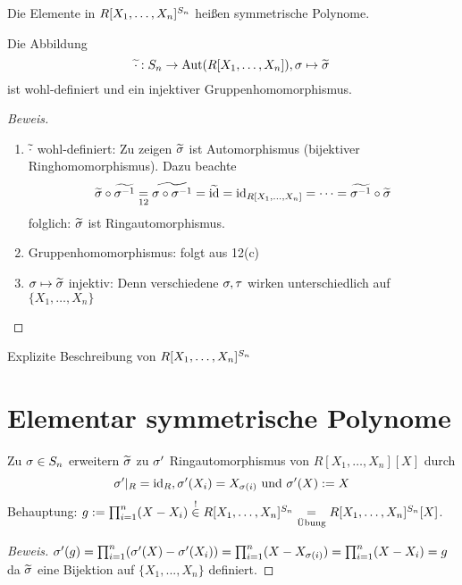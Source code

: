 \documentclass[a4paper]{report}
\begin{document}
\begin{defi}
Die Elemente in $R[X_{1}, \ldots, X_{n}]^{\Sn}$ heißen symmetrische Polynome.
\end{defi}

\begin{kor} Die Abbildung
  \[\tilde \cd : \Sn \to \Aut(R[X_{1}, \ldots, X_{n}]), \s \mps \tilde \s\]
  ist wohl-definiert und ein injektiver Gruppenhomomorphismus.

 \begin{proof}[Beweis]\item
\begin{enumerate}[1)]
  \item $\tilde \cd$ wohl-definiert: Zu zeigen $\tilde \s$ ist Automorphismus (bijektiver Ringhomomorphismus). Dazu beachte
        \[\tilde \s \circ \tilde {\s^{-1}} \underset{12} = \tilde{\s \circ \s^{-1}} = \tilde \id = \id_{R[X_{1}, \ldots, X_{n}]} = \cdots = \tilde {\s^{-1}} \circ \tilde \s\]
        folglich: $\tilde \s$ ist Ringautomorphismus.
  \item Gruppenhomomorphismus: folgt aus 12(c)
  \item $\s \mps \tilde \s$ injektiv: Denn verschiedene $\s, \tau$ wirken unterschiedlich auf $\{X_{1}, \ldots, X_{n}\}$
\end{enumerate}
 \end{proof}
\end{kor}

\begin{bem*}
Explizite Beschreibung von $R[X_{1}, \ldots, X_{n}]^{\Sn}$
\end{bem*}
\section{Elementar symmetrische Polynome}%
\begin{prop*}
Zu $\s \in \Sn$ erweitern $\tilde \s$ zu $\s'$ Ringautomorphismus von $R[X_{1}, \ldots, X_{n}][X]$ durch \[\s'|_{R} = \id_{R}, \s'(X_{i}) = X_{\s(i)} \text{ und } \s'(X) := X\]
Behauptung: $g:= \prod_{i = 1}^{n}(X - X_{i}) \overset ! \in R[X_{1}, \ldots, X_{n}]^{S_{n}} \ueb = R[X_{1}, \ldots, X_{n}]^{\Sn}[X]$.
\begin{proof}[Beweis]
  $\s'(g) = \prod_{i=1}^n (\s'(X) - \s'(X_{i})) = \prod_{i=1}^n (X - X_{\s(i)}) = \prod_{i=1}^n (X-X_{i}) = g$ da $\tilde \s$ eine Bijektion auf $\{X_{1}, ..., X_{n}\}$ definiert.
\end{proof}
\end{prop*}
\end{document}
